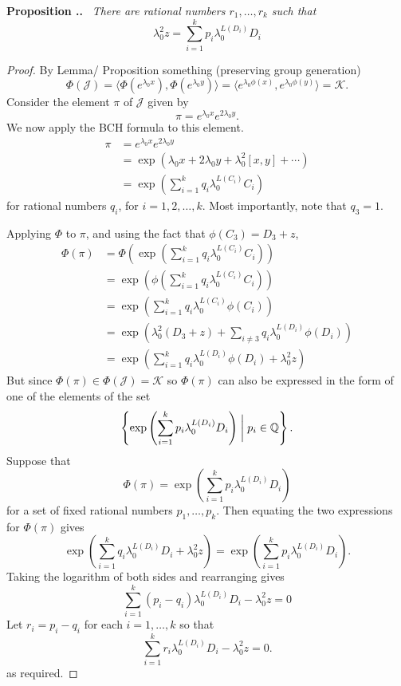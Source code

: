 \documentclass[honours]{UNSWthesis}
\newcommand{\Q}{\mathbb{Q}}
\newcommand{\1}{\mathbf{e}_{1}}
\newcommand{\2}{\mathbf{e}_{3}}
\newcommand{\3}{\mathbf{e}_{3}}
\newcounter{Item}[section]
\newenvironment{Proposition}{\medskip
                            \refstepcounter{Item}
                            \noindent
                           {\bf Proposition \thesection.\theItem.}\ %
                            \begingroup \sl}
                           {\endgroup\medskip}
\begin{document}
\begin{Proposition}
There are rational numbers $r_1,\ldots,r_k$ such that 
\[
\lambda_0^2 z= \sum\limits_{i=1}^{k} p_i \lambda_0^{L(D_{i})}D_i
\]
\end{Proposition}
\begin{proof}
By Lemma/ Proposition something (preserving group generation) 
\[
\Phi(\mathcal{J}) =\langle \Phi(e^{\lambda_0 x}), \Phi(e^{\lambda_0 y})\rangle =\langle e^{\lambda_0 \phi(x)}, e^{\lambda_0 \phi(y)} \rangle =\mathcal{K}.
\]
Consider the element $\pi$ of $\mathcal{J}$ given by 
\[
\pi = e^{\lambda_{0} x}e^{2\lambda_{0} y}.
\]
We now apply the BCH formula to this element. 
\begin{align*}
\pi &= e^{\lambda_{0} x}e^{2\lambda_{0} y}\\
&= \exp \left( \lambda_{0} x+2\lambda_{0} y + \lambda_{0}^2[ x, y] + \cdots \right) \\
&= \exp \left( \sum\limits_{i=1}^{k}q_i \lambda_0^{L(C_i)} C_i  \right)
\end{align*}
for rational numbers $q_i$, for $i=1,2,\ldots, k$. Most importantly, note that $q_3=1$.

Applying $\Phi$ to $\pi$, and using the fact that $\phi(C_3)=D_3+z$, 
\begin{align*}
\Phi(\pi) &= \Phi \left( \exp \left( \sum\limits_{i=1}^{k}q_i \lambda_0^{L(C_i)}C_i \right)\right) \\
&= \exp \left(\phi\left(\sum\limits_{i=1}^{k}q_i \lambda_0^{L(C_i)}C_i \right)\right) \\
&= \exp \left(\sum\limits_{i=1}^{k}q_i \lambda_0^{L(C_i)}\phi(C_i) \right) \\
&=\exp \left(\lambda_0^2(D_3 + z) +\sum\limits_{i \neq 3} q_i \lambda_0^{L(D_i)}\phi(D_i) \right) \\
&= \exp \left(\sum\limits_{i=1}^{k}q_i \lambda_0^{L(D_i)}\phi(D_i)+\lambda_0^2 z \right)
\end{align*}
But since $\Phi(\pi) \in \Phi(\mathcal{J})=\mathcal{K}$ so $\Phi(\pi)$ can also be expressed in the form of one of the elements of the set 
\[
\left\lbrace \exp \left( \sum\limits_{i=1}^{k} p_{i}\lambda_{0}^{L(D_{i})}D_{i} \right) \biggm| p_{i} \in \Q \right\rbrace.
\]
Suppose that 
\[
\Phi(\pi)=\exp \left( \sum\limits_{i=1}^{k} p_{i}\lambda_{0}^{L(D_{i})}D_{i} \right)
\]
for a set of fixed rational numbers $p_1,\ldots,p_k$. Then equating the two expressions for $\Phi(\pi)$ gives 
\[
\exp \left(\sum\limits_{i=1}^{k}q_i \lambda_0^{L(D_i)}D_i+\lambda_0^2 z \right) =\exp \left( \sum\limits_{i=1}^{k} p_{i}\lambda_{0}^{L(D_{i})}D_{i} \right).
\]
Taking the logarithm of both sides and rearranging gives
\[
\sum\limits_{i=1}^{k}(p_i-q_i) \lambda_0^{L(D_i)}D_i-\lambda_0^2 z=0
\]
Let $r_i = p_i-q_i$ for each $i=1,\ldots,k$ so that 
\[
\sum\limits_{i=1}^{k}r_i \lambda_0^{L(D_i)}D_i-\lambda_0^2 z=0.
\]
as required. 
\end{proof}
\end{document}
